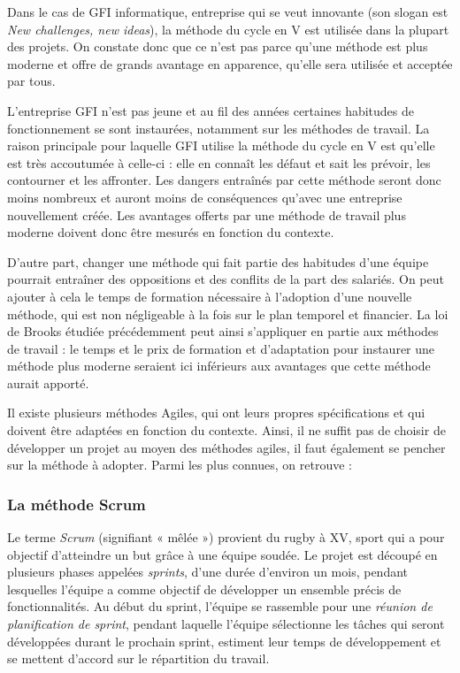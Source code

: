 \begin{app}
Dans le cas de GFI informatique, entreprise qui se veut innovante (son slogan est \textit{New challenges, new ideas}), la méthode du cycle en V est utilisée dans la plupart des projets. On constate donc que ce n'est pas parce qu'une méthode est plus moderne et offre de grands avantage en apparence, qu'elle sera utilisée et acceptée par tous.

L'entreprise GFI n'est pas jeune et au fil des années certaines habitudes de fonctionnement se sont instaurées, notamment sur les méthodes de travail. La raison principale pour laquelle GFI utilise la méthode du cycle en V est qu'elle est très accoutumée à celle-ci : elle en connaît les défaut et sait les prévoir, les contourner et les affronter. Les dangers entraînés par cette méthode seront donc moins nombreux et auront moins de conséquences qu'avec une entreprise nouvellement créée. Les avantages offerts par une méthode de travail plus moderne doivent donc être mesurés en fonction du contexte.

D'autre part, changer une méthode qui fait partie des habitudes d'une équipe pourrait entraîner des oppositions et des conflits de la part des salariés. On peut ajouter à cela le temps de formation nécessaire à l'adoption d'une nouvelle méthode, qui est non négligeable à la fois sur le plan temporel et financier. La loi de Brooks étudiée précédemment peut ainsi s'appliquer en partie aux méthodes de travail : le temps et le prix de formation et d'adaptation pour instaurer une méthode plus moderne seraient ici inférieurs aux avantages que cette méthode aurait apporté.
\end{app}

Il existe plusieurs méthodes Agiles, qui ont leurs propres spécifications et qui doivent être adaptées en fonction du contexte. Ainsi, il ne suffit pas de choisir de développer un projet au moyen des méthodes agiles, il faut également se pencher sur la méthode à adopter. Parmi les plus connues, on retrouve :

\subsubsection{La méthode Scrum}

Le terme \textit{Scrum} (signifiant « mêlée ») provient du rugby à XV, sport qui a pour objectif d'atteindre un but grâce à une équipe soudée.
Le projet est découpé en plusieurs phases appelées \textit{sprints}, d'une durée d'environ un mois, pendant lesquelles l'équipe a comme objectif de développer un ensemble précis de fonctionnalités.
Au début du sprint, l'équipe se rassemble pour une \textit{réunion de planification de sprint}, pendant laquelle l'équipe sélectionne les tâches qui seront développées durant le prochain sprint, estiment leur temps de développement et se mettent d'accord sur le répartition du travail.

